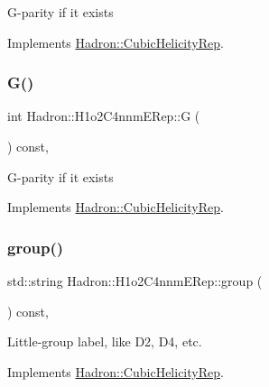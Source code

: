 G-\/parity if it exists 

Implements \mbox{\hyperlink{structHadron_1_1CubicHelicityRep_a50689f42be1e6170aa8cf6ad0597018b}{Hadron\+::\+Cubic\+Helicity\+Rep}}.

\mbox{\label{structHadron_1_1H1o2C4nnmERep_a5ff5cb2d786f5befca7638a9dcaf3f14}} 
\subsubsection{\texorpdfstring{G()}{G()}\hspace{0.1cm}{\footnotesize\ttfamily [2/2]}}
{\footnotesize\ttfamily int Hadron\+::\+H1o2\+C4nnm\+E\+Rep\+::G (\begin{DoxyParamCaption}{ }\end{DoxyParamCaption}) const\hspace{0.3cm}{\ttfamily [inline]}, {\ttfamily [virtual]}}

G-\/parity if it exists 

Implements \mbox{\hyperlink{structHadron_1_1CubicHelicityRep_a50689f42be1e6170aa8cf6ad0597018b}{Hadron\+::\+Cubic\+Helicity\+Rep}}.

\mbox{\label{structHadron_1_1H1o2C4nnmERep_a23b4794a3121b2c1d2fdbb09b4191816}} 
\subsubsection{\texorpdfstring{group()}{group()}\hspace{0.1cm}{\footnotesize\ttfamily [1/2]}}
{\footnotesize\ttfamily std\+::string Hadron\+::\+H1o2\+C4nnm\+E\+Rep\+::group (\begin{DoxyParamCaption}{ }\end{DoxyParamCaption}) const\hspace{0.3cm}{\ttfamily [inline]}, {\ttfamily [virtual]}}

Little-\/group label, like D2, D4, etc. 

Implements \mbox{\hyperlink{structHadron_1_1CubicHelicityRep_a101a7d76cd8ccdad0f272db44b766113}{Hadron\+::\+Cubic\+Helicity\+Rep}}.

\mbox{\label{structHadron_1_1H1o2C4nnmERep_a23b4794a3121b2c1d2fdbb09b4191816}} 
